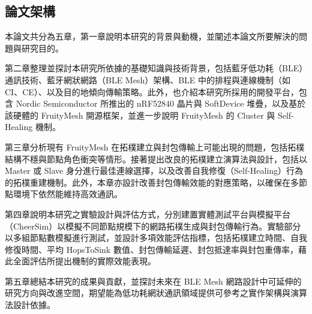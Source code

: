 \begin{ZhChapter}
\section{論文架構}
本論文共分為五章，第一章說明本研究的背景與動機，並闡述本論文所要解決的問題與研究目的。

第二章整理並探討本研究所依據的基礎知識與技術背景，包括藍牙低功耗（BLE）通訊技術、藍牙網狀網路（BLE Mesh）架構、BLE 中的排程與連線機制（如 CI、CE）、以及目的地傾向傳輸策略。此外，也介紹本研究所採用的開發平台，包含 Nordic Semiconductor 所推出的 nRF52840 晶片與 SoftDevice 堆疊，以及基於該硬體的 FruityMesh 開源框架，並進一步說明 FruityMesh 的 Cluster 與 Self-Healing 機制。

第三章分析現有 FruityMesh 在拓樸建立與封包傳輸上可能出現的問題，包括拓樸結構不穩與節點角色衝突等情形。接著提出改良的拓樸建立演算法與設計，包括以 Master 或 Slave 身分進行最佳連線選擇，以及改善自我修復（Self-Healing）行為的拓樸重建機制。此外，本章亦設計改善封包傳輸效能的對應策略，以確保在多節點環境下依然能維持高效通訊。

第四章說明本研究之實驗設計與評估方式，分別建置實體測試平台與模擬平台（CheerSim）以模擬不同節點規模下的網路拓樸生成與封包傳輸行為。實驗部分以多組節點數模擬進行測試，並設計多項效能評估指標，包括拓樸建立時間、自我修復時間、平均 HopsToSink 數值、封包傳輸延遲、封包抵達率與封包重傳率，藉此全面評估所提出機制的實際效能表現。

第五章總結本研究的成果與貢獻，並探討未來在 BLE Mesh 網路設計中可延伸的研究方向與改進空間，期望能為低功耗網狀通訊領域提供可參考之實作架構與演算法設計依據。


\end{ZhChapter}